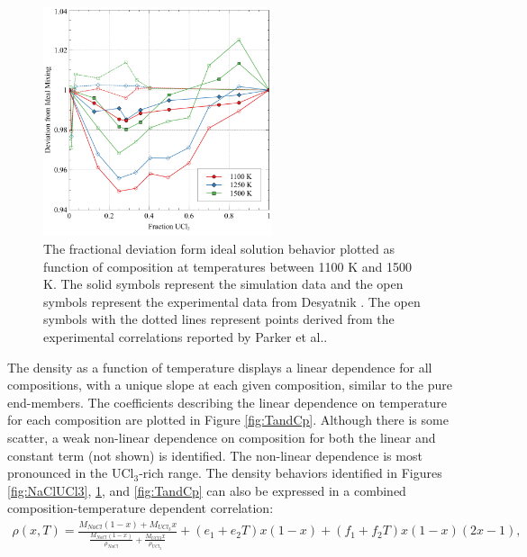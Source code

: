 \documentclass[preprint,3p,10pt,onecolumn,number,sort&compress]{elsarticle}
\begin{document}
\begin{figure}[htb]
\centering
\includegraphics[width=0.6\textwidth]{fig7.pdf}
\caption{The fractional deviation form ideal solution behavior plotted as function of composition at temperatures between 1100 K and 1500 K. The solid symbols represent the simulation data and the open symbols represent the experimental data from Desyatnik \cite{Desyatnik}. The open symbols with the dotted lines represent points derived from the experimental correlations reported by Parker et al.\cite{Parker}.} 
\label{fig:ideal}
\end{figure}

The density as a function of temperature displays a linear dependence for all compositions, with a unique slope at each given composition, similar to the pure end-members. The coefficients describing the linear dependence on temperature for each composition are plotted in Figure \ref{fig:TandCp}. Although there is some scatter, a weak non-linear dependence on composition for both the linear and constant term (not shown) is identified. The non-linear dependence is most pronounced in the UCl$_3$-rich range. The density behaviors identified in Figures \ref{fig:NaClUCl3}, \ref{fig:ideal}, and \ref{fig:TandCp} can also be expressed in a combined composition-temperature dependent correlation:
\begin{equation}
\begin{split}
\rho(x,T)=\frac{M_{NaCl}(1-x)+M_{UCl_3}x}{\frac{M_{NaCl}(1-x)}{\rho_{NaCl}}+\frac{M_{UCl3}x}{\rho_{UCl_3}}}+(e_1+e_2T)x(1-x)+(f_1+f_2T)x(1-x)(2x-1), 
\label{eq:LS}
\end{split}
\end{equation}
\end{document}

